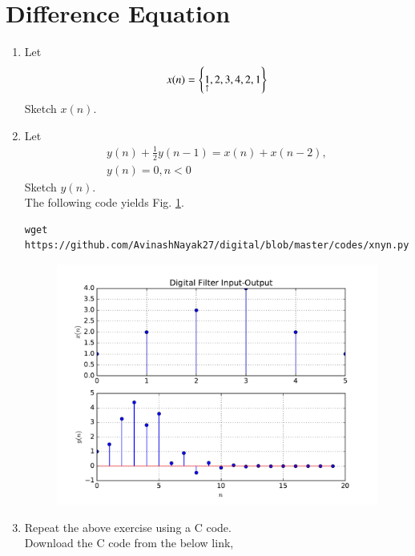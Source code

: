 \documentclass[journal,12pt,twocolumn]{IEEEtran}
\renewcommand\thesection{\arabic{section}}
\begin{document}
\section{Difference Equation}
\begin{enumerate}[label=\thesection.\arabic*,ref=\thesection.\theenumi]
\item Let
	\label{def:xn}
\begin{equation}
x(n) = \left\{\underset{\uparrow}{1},2,3,4,2,1\right\}
\end{equation}
Sketch $x(n)$.
\item Let
\begin{multline}
\label{eq:iir_filter}
y(n) + \frac{1}{2}y(n-1) = x(n) + x(n-2), 
\\
 y(n) = 0, n < 0
\end{multline}
Sketch $y(n)$.  
\\
\solution The following code yields Fig. \ref{fig:xnyn}.
\begin{lstlisting}
wget https://github.com/AvinashNayak27/digital/blob/master/codes/xnyn.py
\end{lstlisting}
\begin{figure}[!ht]
\begin{center}
\includegraphics[width=\columnwidth]{./figs/xnyn}
\end{center}
\label{fig:xnyn}	
\end{figure}
\item Repeat the above exercise using a C code.\\
 \solution Download the C code from the below link,
   \begin{lstlisting}

\end{lstlisting}
\end{enumerate}
\end{document}
